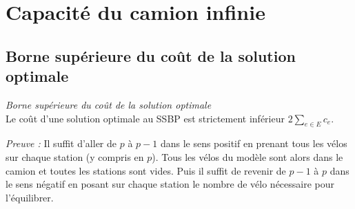 \chapter{Capacité du camion infinie}

\section{Borne supérieure du coût de la solution optimale}

\begin{lem}\emph{Borne supérieure du coût de la solution optimale}\\
Le coût d'une solution optimale au SSBP est strictement inférieur $\displaystyle 2\sum_{e \in E}c_e$.
\end{lem}

\textit{Preuve :} Il suffit d'aller de $p$ à $p-1$ dans le sens positif en prenant tous les vélos sur chaque station (y compris en $p$). Tous les vélos du modèle sont alors dans le camion et toutes les stations sont vides. Puis il suffit de revenir de $p-1$ à $p$ dans le sens négatif en posant sur chaque station le nombre de vélo nécessaire pour l'équilibrer.
